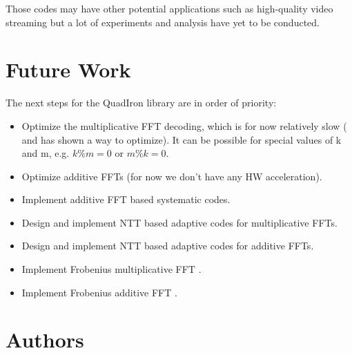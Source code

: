 \documentclass[oneside,9pt]{article}
\begin{document}
Those codes may have other potential applications such as high-quality video streaming but a lot of experiments and analysis have yet to be conducted.

\section{Future Work}
The next steps for the QuadIron library are in order of priority:
\begin{itemize}
\item Optimize the multiplicative FFT decoding, which is for now relatively slow (\cite{fnt_ida} and \cite{gao_decode} has shown a way to optimize). It can be possible for special values of k and m, e.g. $k \% m = 0$ or $m \% k = 0$.
\item Optimize additive FFTs (for now we don't have any HW acceleration).
\item Implement additive FFT based systematic codes.
\item Design and implement NTT based adaptive codes for multiplicative FFTs.
\item Design and implement NTT based adaptive codes for additive FFTs.
\item Implement Frobenius multiplicative FFT \cite{frobenius_fft}.
\item Implement Frobenius additive FFT \cite{frob_additive}.
\end{itemize}





\section*{Authors}
\end{document}
